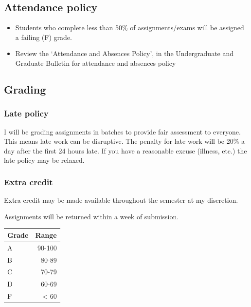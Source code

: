 \documentclass[11pt,]{article}
\begin{document}
\hypertarget{attendance-policy}{%
\subsection{Attendance policy}\label{attendance-policy}}

\begin{itemize}
\item
  Students who complete less than 50\% of assignments/exams will be
  assigned a failing (F) grade.
\item
  Review the `Attendance and Absences Policy', in the Undergraduate and
  Graduate Bulletin for attendance and absences policy
\end{itemize}

\hypertarget{grading}{%
\subsection{Grading}\label{grading}}

\hypertarget{late-policy}{%
\subsubsection{Late policy}\label{late-policy}}

I will be grading assignments in batches to provide fair assessment to
everyone. This means late work can be disruptive. The penalty for late
work will be 20\% a day after the first 24 hours late. If you have a
reasonable excuse (illness, etc.) the late policy may be relaxed.

\hypertarget{extra-credit}{%
\subsubsection{Extra credit}\label{extra-credit}}

Extra credit may be made available throughout the semester at my
discretion.

Assignments will be returned within a week of submission.

\begin{longtable}[]{@{}lr@{}}
\toprule\noalign{}
Grade & Range \\
\midrule\noalign{}
\endhead
\bottomrule\noalign{}
\endlastfoot
A & 90-100 \\
B & 80-89 \\
C & 70-79 \\
D & 60-69 \\
F & \textless{} 60 \\
\end{longtable}
\end{document}
